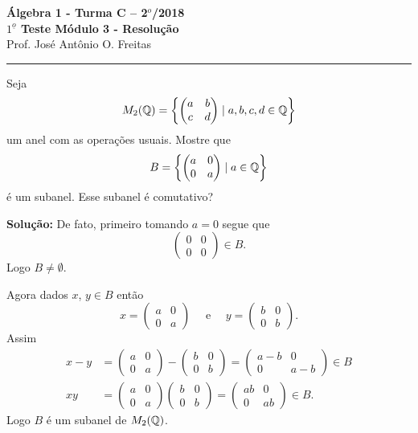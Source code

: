 \documentclass[12pt]{article}
\begin{document}


\begin{center}
{\Large\bf {\'A}lgebra 1 - Turma C -- 2$^{o}$/2018} \\ \vspace{9pt} {\large\bf
  $1^{\underline{o}}$ Teste M\'odulo 3 - Resolu\c{c}\~ao}\\
\vspace{9pt} Prof. Jos{\'e} Ant{\^o}nio O. Freitas
\end{center}
\hrule

\vspace{.6cm}

\questao Seja
\[
	M_2(\mathbb{Q}) = \left\{ \begin{pmatrix}
		a & b\\c & d
	\end{pmatrix} \mid a,b,c,d \in \mathbb{Q}\right\}
\]
um anel com as opera\c{c}\~oes usuais. Mostre que
\[
	B = \left\{ \begin{pmatrix}
		a & 0\\0 & a
	\end{pmatrix} \mid a \in \mathbb{Q}\right\}	
\]
\'e um subanel. Esse subanel \'e comutativo?

\noindent\textbf{Solu\c{c}\~ao:} De fato, primeiro tomando $a = 0$ segue que
\[
	\begin{pmatrix}
		0 & 0\\0 & 0
	\end{pmatrix} \in B.
\]
Logo $B \ne \emptyset$.

Agora dados $x$, $y \in B$ ent\~ao
\[
	x = \begin{pmatrix}
		a & 0\\0 & a
	\end{pmatrix}\quad \mbox{ e } \quad y = \begin{pmatrix}
		b & 0\\0 & b
	\end{pmatrix}.
\]
Assim
\begin{align*}
	x - y &= \begin{pmatrix}
		a & 0\\0 & a
	\end{pmatrix} - \begin{pmatrix}
		b & 0\\0 & b
	\end{pmatrix} = \begin{pmatrix}
		a - b & 0\\0 & a - b
	\end{pmatrix} \in B\\
	xy &= \begin{pmatrix}
		a & 0\\0 & a
	\end{pmatrix}\begin{pmatrix}
		b & 0\\0 & b
	\end{pmatrix} = \begin{pmatrix}
		ab & 0\\0 & ab
	\end{pmatrix} \in B.
\end{align*}
Logo $B$ \'e um subanel de $M_2(\mathbb{Q})$.
\end{document}
